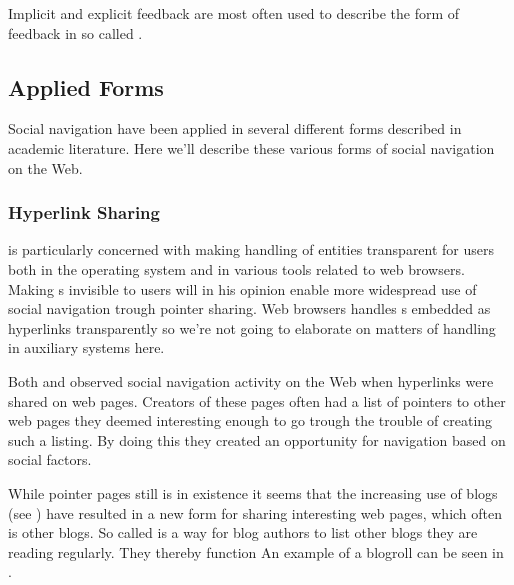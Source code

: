 Implicit and explicit feedback are most often used to
describe the form of feedback in so called %
\citep[p.~82]{oard98}.



\subsection{Applied Forms}

Social navigation have been applied in several different forms described in
academic literature. Here we'll describe these various forms of social
navigation on the Web.

\subsubsection{Hyperlink Sharing}

\citet{dieberger97} is particularly concerned with making handling of
%
entities transparent for users both in the operating system and in various
tools related to web browsers. Making s invisible to users will in
his opinion enable more widespread use of social navigation trough pointer
sharing. Web browsers handles s embedded as hyperlinks transparently
so we're not going to elaborate on matters of  handling in
auxiliary systems here.

Both \cite{dourish94} and \cite{dieberger97} observed social navigation
activity on the
Web when hyperlinks were shared on web pages. Creators of these pages often
had a list of pointers to other web pages they deemed interesting enough to go
trough the trouble of creating such a listing. By doing this they created
an opportunity for navigation based on social factors.

While pointer pages still is in existence it seems that the increasing
use of blogs (see )
have resulted in a new form for sharing interesting web pages,
which often is other blogs. So called  is a way for blog
authors to list other blogs they are reading regularly. They thereby function
An example of a blogroll can be seen in .

